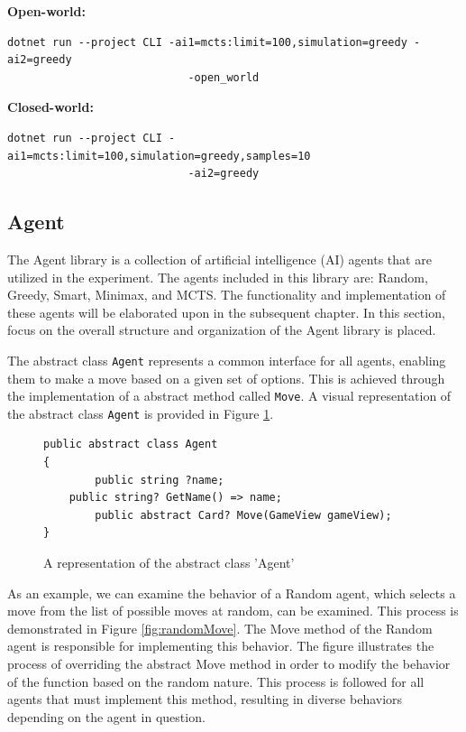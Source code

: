 \textbf{Open-world: }
\begin{lstlisting}
dotnet run --project CLI -ai1=mcts:limit=100,simulation=greedy -ai2=greedy 
							-open_world
\end{lstlisting}

\textbf{Closed-world: }
\begin{lstlisting}
dotnet run --project CLI -ai1=mcts:limit=100,simulation=greedy,samples=10 
							-ai2=greedy
\end{lstlisting}



\subsection{Agent}

The Agent library is a collection of artificial intelligence (AI) agents that are utilized in the experiment. The agents included in this library are: Random, Greedy, Smart, Minimax, and MCTS. The functionality and implementation of these agents will be elaborated upon in the subsequent chapter. In this section, focus on the overall structure and organization of the Agent library is placed.

The abstract class \texttt{Agent} represents a common interface for all agents, enabling them to make a move based on a given set of options. This is achieved through the implementation of a abstract method called \texttt{Move}. A visual representation of the abstract class \texttt{Agent} is provided in Figure \ref{fig:abstractClass}.

\begin{figure}[h]
\captionsetup{justification=centering}
\begin{lstlisting}
public abstract class Agent
{
    	public string ?name;
	public string? GetName() => name;
    	public abstract Card? Move(GameView gameView);
}
\end{lstlisting}
\caption{A representation of the abstract class 'Agent'}
\label{fig:abstractClass}
\end{figure}

As an example, we can examine the behavior of a Random agent, which selects a move from the list of possible moves at random, can be examined. This process is demonstrated in Figure \ref{fig:randomMove}. The Move method of the Random agent is responsible for implementing this behavior. The figure illustrates the process of overriding the abstract Move method in order to modify the behavior of the function based on the random nature. This process is followed for all agents that must implement this method, resulting in diverse behaviors depending on the agent in question.